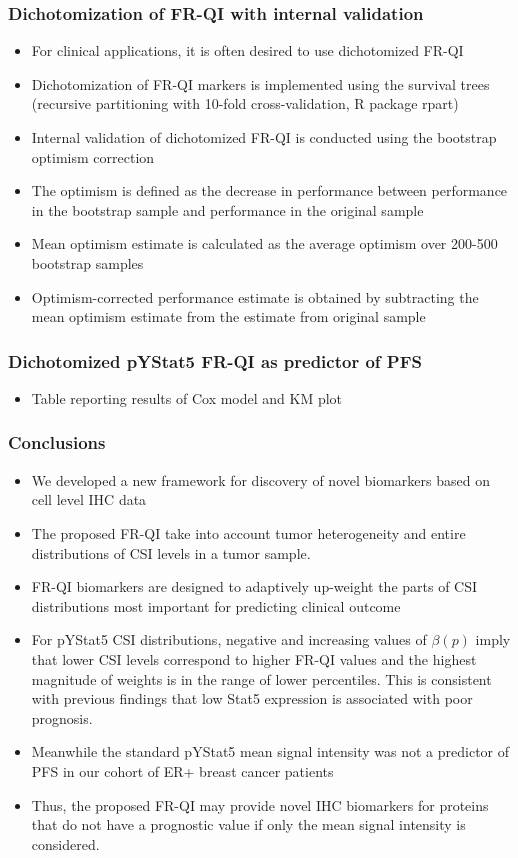 \documentclass[t,10pt]{beamer}
\begin{document}
	
	\frame
	{\frametitle{Dichotomization of FR-QI with internal validation}
		\begin{itemize}	
		      \item For clinical applications, it is often desired to use dichotomized FR-QI 
		      \item Dichotomization of FR-QI markers is implemented using the survival trees (recursive partitioning with 10-fold cross-validation, R package rpart)
			\item Internal validation of dichotomized FR-QI is conducted using the bootstrap optimism correction \cite{Steyerberg19}
			\item The optimism is defined as the decrease in performance between performance in the bootstrap sample and performance in the original sample 
			\bigskip
			\item Mean optimism estimate is calculated as the average optimism over 200-500 bootstrap samples
			\bigskip
			\item Optimism-corrected performance estimate is obtained by subtracting the mean optimism estimate from the estimate from original sample
		\end{itemize}
	}

			
	\frame
	{\frametitle{Dichotomized pYStat5 FR-QI as predictor of PFS}
		\begin{itemize}	
			\item Table reporting results of Cox model and KM plot
		\end{itemize}
	}	

	\frame
	{\frametitle{Conclusions}
		\begin{itemize}	
\item	 We developed a new framework for discovery of novel biomarkers based on cell level IHC data
\item	 The proposed FR-QI take into account tumor heterogeneity and entire distributions of CSI levels in a tumor sample.
\item	 FR-QI biomarkers are designed to adaptively up-weight the parts of CSI distributions most important for predicting clinical outcome
\item	 For pYStat5 CSI distributions, negative and increasing values of $\beta(p)$ imply that lower CSI levels correspond to higher FR-QI values and the highest magnitude of weights is in the range of lower percentiles.  This is consistent with previous findings that low Stat5 expression is associated with poor prognosis.
\item	 Meanwhile the standard pYStat5 mean signal intensity was not a predictor of PFS in our cohort of ER+ breast cancer patients
\item	 Thus, the proposed FR-QI may provide novel IHC biomarkers for proteins that do not have a prognostic value if only the mean signal intensity is considered.
  \end{itemize}
	}				
\end{document}
